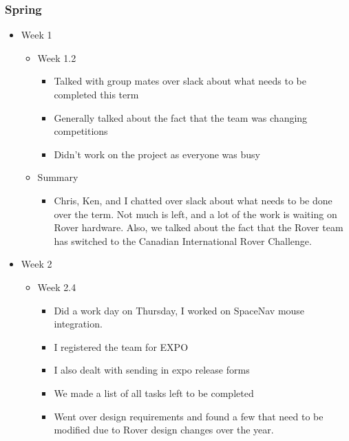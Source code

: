 \subsubsection{Spring}
\begin{itemize}
\item Week 1
	\begin{itemize}
	\item Week 1.2
      \begin{itemize}
      \item Talked with group mates over slack about what needs to be completed this term 
      \item Generally talked about the fact that the team was changing competitions 
      \item Didn't work on the project as everyone was busy 
      \end{itemize}

    \item Summary
      \begin{itemize}
      \item Chris, Ken, and I chatted over slack about what needs to be done over the term. Not much is left, and a lot of the work is waiting on Rover hardware. Also, we talked about the fact that the Rover team has switched to the Canadian International Rover Challenge. 
      \end{itemize}
	\end{itemize}

\item Week 2
	\begin{itemize}
	\item Week 2.4
      \begin{itemize}
      \item Did a work day on Thursday, I worked on SpaceNav mouse integration. 
      \item I registered the team for EXPO 
      \item I also dealt with sending in expo release forms 
      \item We made a list of all tasks left to be completed 
      \item Went over design requirements and found a few that need to be modified due to Rover design changes over the year. 
      \end{itemize}
    

\end{itemize}
\end{itemize}
